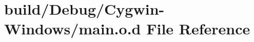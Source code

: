 \hypertarget{_cygwin-_windows_2main_8o_8d}{}\section{build/\+Debug/\+Cygwin-\/\+Windows/main.o.\+d File Reference}
\label{_cygwin-_windows_2main_8o_8d}
